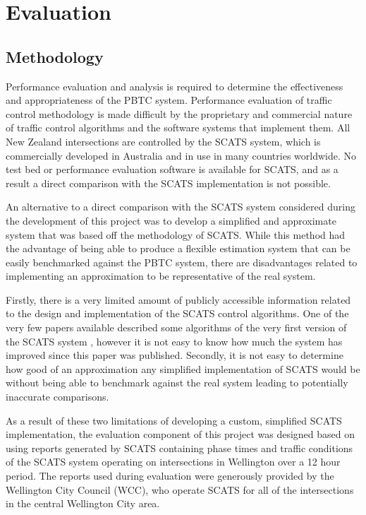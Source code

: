 \chapter{Evaluation}
\label{chapter:evaluation}

\section{Methodology}

Performance evaluation and analysis is required to determine the effectiveness and appropriateness of the PBTC system. Performance evaluation of traffic control methodology is made difficult by the proprietary and commercial nature of traffic control algorithms and the software systems that implement them. All New Zealand intersections are controlled by the SCATS system, which is commercially developed in Australia and in use in many countries worldwide. No test bed or performance evaluation software is available for SCATS, and as a result a direct comparison with the SCATS implementation is not possible.

An alternative to a direct comparison with the SCATS system considered during the development of this project was to develop a simplified and approximate system that was based off the methodology of SCATS. While this method had the advantage of being able to produce a flexible estimation system that can be easily benchmarked against the PBTC system, there are disadvantages related to implementing an approximation to be representative of the real system. 

Firstly, there is a very limited amount of publicly accessible information related to the design and implementation of the SCATS control algorithms. One of the very few papers available described some algorithms of the very first version of the SCATS system , however it is not easy to know how much the system has improved since this paper was published. Secondly, it is not easy to determine how good of an approximation any simplified implementation of SCATS would be without being able to benchmark against the real system leading to potentially inaccurate comparisons. 

As a result of these two limitations of developing a custom, simplified SCATS implementation, the evaluation component of this project was designed based on using reports generated by SCATS containing phase times and traffic conditions of the SCATS system operating on intersections in Wellington over a 12 hour period. The reports used during evaluation were generously provided by the Wellington City Council (WCC), who operate SCATS for all of the intersections in the central Wellington City area. 


